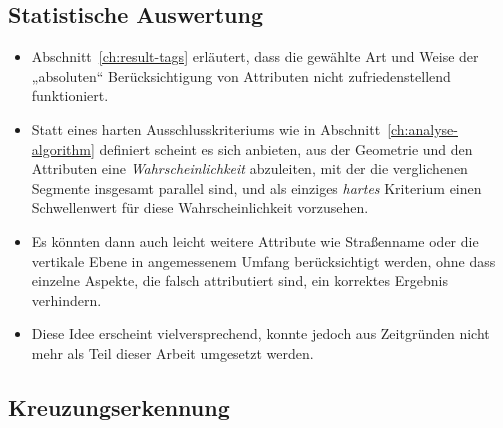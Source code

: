 \documentclass[../main/thesis.tex]{subfiles}
\begin{document}
\subsection{Statistische Auswertung}

\begin{itemize}

\item
Abschnitt~\ref{ch:result-tags} erläutert, dass die gewählte Art und Weise der „absoluten“ Berücksichtigung von Attributen nicht zufriedenstellend funktioniert.

\item
Statt eines harten Ausschlusskriteriums wie in Abschnitt~\ref{ch:analyse-algorithm} definiert scheint es sich anbieten, aus der Geometrie und den Attributen eine \emph{Wahrscheinlichkeit} abzuleiten, mit der die verglichenen Segmente insgesamt parallel sind, und als einziges \emph{hartes} Kriterium einen Schwellenwert für diese Wahrscheinlichkeit vorzusehen.

\item
Es könnten dann auch leicht weitere Attribute wie Straßenname oder die vertikale Ebene in angemessenem Umfang berücksichtigt werden, ohne dass einzelne Aspekte, die falsch attributiert sind, ein korrektes Ergebnis verhindern.

\item
Diese Idee erscheint vielversprechend, konnte jedoch aus Zeitgründen nicht mehr als Teil dieser Arbeit umgesetzt werden.

\end{itemize}




\subsection{Kreuzungserkennung}
\end{document}

